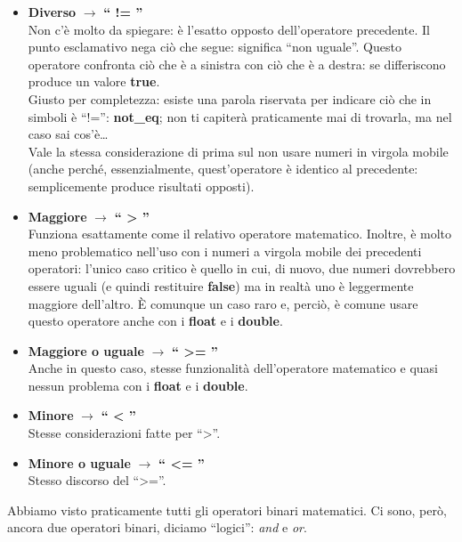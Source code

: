 \begin{itemize}
	\item \textbf{Diverso} $\to$ \textbf{`` != ''}
	\\Non c'è molto da spiegare: è l'esatto opposto dell'operatore precedente. Il punto esclamativo nega ciò che segue: significa ``non uguale''. Questo operatore confronta ciò che è a sinistra con ciò che è a destra: se differiscono produce un valore \textbf{true}.
	\\Giusto per completezza: esiste una parola riservata per indicare ciò che in simboli è ``!='': \textbf{not\_eq}; non ti capiterà praticamente mai di trovarla, ma nel caso sai cos'è\ldots
	\\Vale la stessa considerazione di prima sul non usare numeri in virgola mobile (anche perché, essenzialmente, quest'operatore è identico al precedente: semplicemente produce risultati opposti).
	
	\item \textbf{Maggiore}  $\to$ \textbf{`` > ''}
	\\Funziona esattamente come il relativo operatore matematico. Inoltre, è molto meno problematico nell'uso con i numeri a virgola mobile dei precedenti operatori: l'unico caso critico è quello in cui, di nuovo, due numeri dovrebbero essere uguali (e quindi restituire \textbf{false}) ma in realtà uno è leggermente maggiore dell'altro. \`E comunque un caso raro e, perciò, è comune usare questo operatore anche con i \textbf{float} e i \textbf{double}.
	\item \textbf{Maggiore o uguale}  $\to$ \textbf{`` >= ''}
	\\Anche in questo caso, stesse funzionalità dell'operatore matematico e quasi nessun problema con i \textbf{float} e i \textbf{double}.
	\item \textbf{Minore} $\to$ \textbf{`` < ''}
	\\Stesse considerazioni fatte per ``>''.
	
	\item \textbf{Minore o uguale}  $\to$ \textbf{`` <= ''}
	\\Stesso discorso del ``>=''.
	\end{itemize}
	
	Abbiamo visto praticamente tutti gli operatori binari matematici. Ci sono, però, ancora due operatori binari, diciamo ``logici'': \emph{and} e \emph{or}.
	
